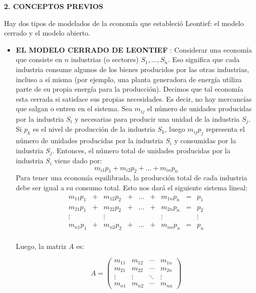 \documentclass[10pt,a4paper]{article}
\begin{document}
\begin{multicols}{2}
\begin{center}
{\large \bf 2. CONCEPTOS PREVIOS}
\end{center}
Hay dos tipos de modelados de la economía que estableció Leontief: el modelo cerrado y el modelo abierto.\\
\begin{itemize}
	\item \textbf{EL MODELO CERRADO DE LEONTIEF} : Considerar una economía que consiste en $n$ industrias (o sectores)   $S_{1}, ... , S_{n}$. Eso significa que cada industria consume algunos de los bienes producidos por las otras industrias, incluso a sí misma (por ejemplo, una planta generadora de energía utiliza parte de su propia energía para la producción). Decimos que tal economía esta cerrada si satisface sus propias necesidades. Es decir, no hay mercancías que salgan o entren en el sistema. Sea $m_{ij}$ el número de unidades producidas por la industria $S_{i}$ y necesarias para producir una unidad de la industria $S_{j}$. Si $p_{k}$ es el nivel de producción de la industria $S_{k}$, luego $m_{ij}p_{j}$ representa el número de unidades producidas por la industria $S_{i}$ y consumidas por la industria $S_{j}$. Entonces, el número total de unidades producidas por la industria $S_{i}$ viene dado por:
	$$ m_{i1}p_{1} + m_{i2}p_{2} + ... + m_{in}p_{n} $$
Para tener una economía equilibrada, la producción total de cada industria debe ser igual a su consumo total. Esto nos dará el siguiente sistema lineal:
\begin{equation*}
	\begin{matrix}
	m_{11}p_{1} &+& m_{12}p_{2} &+& \ldots  &+ &m_{1n}p_{n} &=& p_{1}\\
	m_{21}p_{1} &+& m_{22}p_{2} &+&\ldots  &+& m_{2n}p_{n} &=& p_{2}\\
	\vdots&&\vdots&&&&\vdots&&\vdots\\         
	m_{n1}p_{1} &+& m_{n2}p_{2} &+& ... & +& m_{nn}p_{n} &=& p_{n}
	\end{matrix}
\end{equation*}\\
Luego, la matriz $A$ es:   
    
 \[ A =
 \left( \begin{array}{cccc}
 m_{11} & m_{12} & \cdots & m_{1n} \\ 
 m_{21} & m_{22} & \cdots & m_{2n} \\
 \vdots & \vdots & \ddots & \vdots \\
 m_{n1} & m_{n2} & \cdots & m_{nn}
 \end{array} \right) \]\\
 

\end{itemize}
\end{multicols}
\end{document}
